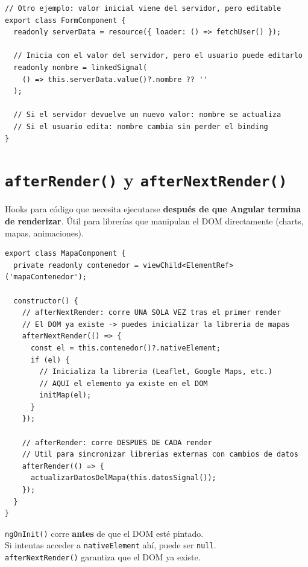 \documentclass[12pt, a4paper]{article}
\begin{document}
\begin{lstlisting}
// Otro ejemplo: valor inicial viene del servidor, pero editable
export class FormComponent {
  readonly serverData = resource({ loader: () => fetchUser() });

  // Inicia con el valor del servidor, pero el usuario puede editarlo
  readonly nombre = linkedSignal(
    () => this.serverData.value()?.nombre ?? ''
  );

  // Si el servidor devuelve un nuevo valor: nombre se actualiza
  // Si el usuario edita: nombre cambia sin perder el binding
}
\end{lstlisting}

\section{  \texttt{afterRender()} y \texttt{afterNextRender()}}

Hooks para código que necesita ejecutarse \textbf{después de que Angular termina de renderizar}.
Útil para librerías que manipulan el DOM directamente (charts, mapas, animaciones).

\begin{lstlisting}
export class MapaComponent {
  private readonly contenedor = viewChild<ElementRef>('mapaContenedor');

  constructor() {
    // afterNextRender: corre UNA SOLA VEZ tras el primer render
    // El DOM ya existe -> puedes inicializar la libreria de mapas
    afterNextRender(() => {
      const el = this.contenedor()?.nativeElement;
      if (el) {
        // Inicializa la libreria (Leaflet, Google Maps, etc.)
        // AQUI el elemento ya existe en el DOM
        initMap(el);
      }
    });

    // afterRender: corre DESPUES DE CADA render
    // Util para sincronizar librerias externas con cambios de datos
    afterRender(() => {
      actualizarDatosDelMapa(this.datosSignal());
    });
  }
}
\end{lstlisting}

\begin{tcolorbox}[peligro, title={\emoji{warning} \emoji{skull} Por qué NO usar \texttt{ngOnInit()} para esto}]
  \texttt{ngOnInit()} corre \textbf{antes} de que el DOM esté pintado.\\
  Si intentas acceder a \texttt{nativeElement} ahí, puede ser \texttt{null}.\\[0.3cm]
   \texttt{afterNextRender()} garantiza que el DOM ya existe.
\end{tcolorbox}
\end{document}
